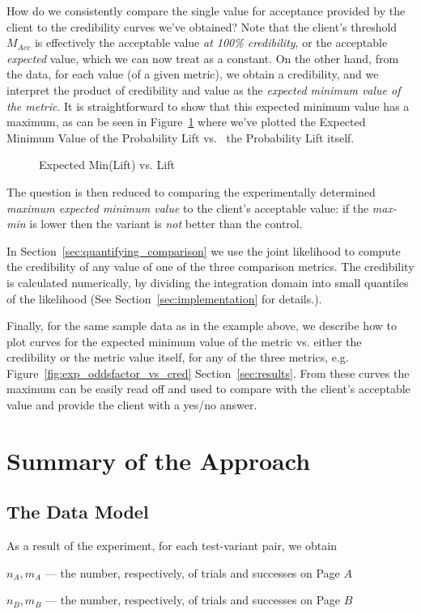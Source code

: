 \documentclass[letterpaper,12pt]{article}
\begin{document}
How do we consistently compare the single value for acceptance
provided by the client to the credibility curves we've obtained? Note
that the client's threshold \(M_{Acc}\) is effectively the acceptable
value {\em at 100\% credibility}, or the acceptable {\em expected}
value, which we can now treat as a constant. On the other hand, from
the data, for each value (of a given metric), we obtain a credibility,
and we interpret the product of credibility and value as the {\em
  expected minimum value of the metric}. It is straightforward to show
that this expected minimum value has a maximum, as can be seen in
Figure~\ref{fig:exp_problift_vs_mvalue} where we've plotted the
Expected Minimum Value of the Probability Lift vs.~ the Probability
Lift itself.
\begin{figure}[ht!]
\centering
\caption{Expected Min(Lift) vs. Lift \label{fig:exp_problift_vs_mvalue}}
\end{figure}
The question is then reduced to comparing the experimentally
determined {\em maximum expected minimum value} to the client's
acceptable value: if the {\em max-min} is lower then the variant is
{\em not} better than the control.

In Section~\ref{sec:quantifying_comparison} we use the joint
likelihood to compute the credibility of any value of
one of the three comparison metrics. The credibility is calculated
numerically, by dividing the integration domain into small quantiles of
the likelihood (See Section~\ref{sec:implementation} for details.).

Finally, for the same sample data as in the example above, we describe
how to plot curves for the expected minimum value of the metric
vs. either the credibility or the metric value itself, for any of the
three metrics, e.g. Figure~\ref{fig:exp_oddsfactor_vs_cred}
Section~\ref{sec:results}. From these curves the maximum can be easily
read off and used to compare with the client's acceptable value and
provide the client with a yes/no answer.

\section{Summary of the Approach}

\subsection{The Data Model}\label{sec:data}
As a result of the experiment, for each test-variant pair, we obtain
\bi
\item \(n_A, m_A\) --- the number, respectively, of trials and
  successes on Page \(A\)
\item \(n_B, m_B\) --- the number, respectively, of trials and
  successes  on Page \(B\)
\ei
\end{document}
